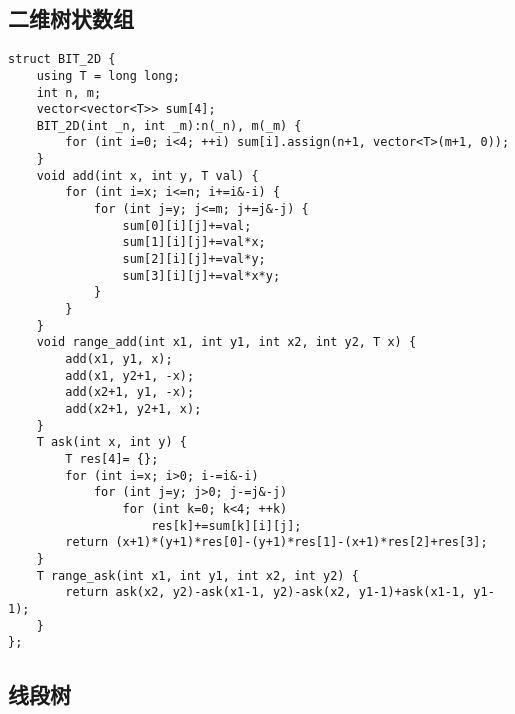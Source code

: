 \subsection{二维树状数组}
\begin{lstlisting}
struct BIT_2D {
    using T = long long;
    int n, m;
    vector<vector<T>> sum[4];
    BIT_2D(int _n, int _m):n(_n), m(_m) {
        for (int i=0; i<4; ++i) sum[i].assign(n+1, vector<T>(m+1, 0));
    }
    void add(int x, int y, T val) {
        for (int i=x; i<=n; i+=i&-i) {
            for (int j=y; j<=m; j+=j&-j) {
                sum[0][i][j]+=val;
                sum[1][i][j]+=val*x;
                sum[2][i][j]+=val*y;
                sum[3][i][j]+=val*x*y;
            }
        }
    }
    void range_add(int x1, int y1, int x2, int y2, T x) {
        add(x1, y1, x);
        add(x1, y2+1, -x);
        add(x2+1, y1, -x);
        add(x2+1, y2+1, x);
    }
    T ask(int x, int y) {
        T res[4]= {};
        for (int i=x; i>0; i-=i&-i)
            for (int j=y; j>0; j-=j&-j)
                for (int k=0; k<4; ++k)
                    res[k]+=sum[k][i][j];
        return (x+1)*(y+1)*res[0]-(y+1)*res[1]-(x+1)*res[2]+res[3];
    }
    T range_ask(int x1, int y1, int x2, int y2) {
        return ask(x2, y2)-ask(x1-1, y2)-ask(x2, y1-1)+ask(x1-1, y1-1);
    }
};
\end{lstlisting}



\subsection{线段树}
